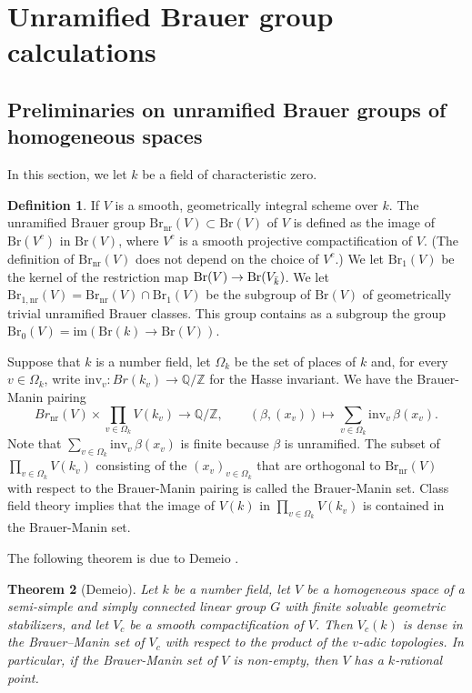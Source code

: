 \documentclass[10pt,letterpaper,twoside]{article}
\renewcommand{\1}{\mathbf{1}}
\newcommand{\nr}{\mathrm{nr}}
\newcommand{\im}{\mathrm{im}}
\newcommand{\Br}{\mathrm{Br}}
\theoremstyle{plain}
\newtheorem{theorem}{Theorem}[section]
\theoremstyle{plain}
\theoremstyle{definition}
\theoremstyle{named}
\theoremstyle{definition}
\newtheorem{definition}[theorem]{Definition}
\begin{document}
\section{Unramified Brauer group calculations}

\subsection{Preliminaries on unramified Brauer groups of homogeneous spaces}

In this section, we let $k$ be a field of characteristic zero.

\begin{definition}
    If $V$ is a smooth, geometrically integral scheme over $k$. The unramified Brauer group $\Br_{\nr}(V)\subset \Br(V)$ of $V$ is defined as the image of $\Br(V^c)$ in $\Br(V)$, where $V^c$ is a smooth projective compactification of $V$. (The definition of $\Br_{\nr}(V)$ does not depend on the choice of $V^c$.) We
    let $\Br_1(V)$ be the kernel of the restriction map $\Br(V)\to \Br(V_{\Bar{k}})$. We let $\Br_{1,\nr}(V)=\Br_\nr(V)\cap\Br_1(V)$ be the subgroup of $\Br(V)$ of geometrically trivial unramified Brauer classes. This group contains as a
    subgroup the group $\Br_0(V)=\im(\Br(k)\rightarrow\Br(V))$.
\end{definition}

Suppose that $k$ is a number field, let $\Omega_k$ be the set of places of $k$ and, for every $v \in \Omega_k$, write $\text{inv}_v: Br(k_v) \to \mathbb{Q}/\mathbb{Z}$ for the Hasse invariant. We have the Brauer-Manin pairing
\[
Br_\nr(V) \times \prod_{v \in \Omega_k} V(k_v) \to \mathbb{Q}/\mathbb{Z}, \qquad (\beta, (x_v)) \mapsto \sum_{v \in \Omega_k} \text{inv}_v \, \beta(x_v).
\]
Note that $\sum_{v \in \Omega_k} \text{inv}_v \, \beta(x_v)$ is finite because $\beta$ is unramified. The subset of $\prod_{v \in \Omega_k} V(k_v)$ consisting of the $(x_v)_{v\in \Omega_k}$ that are orthogonal to $\Br_\nr(V)$ with respect to the Brauer-Manin pairing is called the Brauer-Manin set. Class field theory implies that the image of $V(k)$ in $\prod_{v \in \Omega_k} V(k_v)$ is contained in the Brauer-Manin set.

The following theorem is due to Demeio \cite{}.

\begin{theorem}[Demeio]
    Let $k$ be a number field, let $V$ be a homogeneous space of a semi-simple and simply connected linear group $G$ with finite solvable geometric stabilizers, and let $V_c$ be a smooth compactification of $V$. Then $V_c(k)$ is dense in the Brauer–Manin set of $V_c$ with respect to the product of the $v$-adic topologies. In particular, if the Brauer-Manin set of $V$ is non-empty, then $V$ has a $k$-rational point.
\end{theorem}
\end{document}
